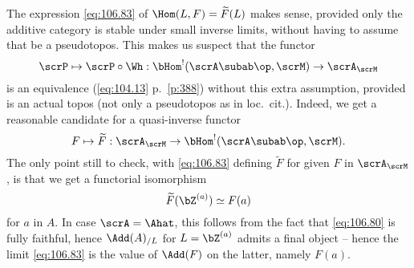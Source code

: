 \begin{remark}
  The expression \eqref{eq:106.83} of $\Hom(L,F)=\widetilde F(L)$
  makes sense, provided only the additive category \scrM{} is stable
  under small inverse limits, without having to assume that \scrM{} be
  a pseudotopos. This makes us suspect that the functor
  \[\scrP\mapsto \scrP\circ\Wh :
  \bHom^!(\scrA\subab\op,\scrM)\to\scrA_\scrM\]
  is an equivalence (\eqref{eq:104.13} p.\ \ref{p:388}) without this
  extra assumption, provided \scrA{} is an actual topos (not only a
  pseudotopos as in loc.\ cit.). Indeed, we get a reasonable candidate
  for a quasi-inverse functor
  \[F\mapsto\widetilde
  F:\scrA_\scrM\to\bHom^!(\scrA\subab\op,\scrM).\]
  The only point still to check, with \eqref{eq:106.83} defining
  $\widetilde F$ for given $F$ in $\scrA_\scrM$, is that we get a
  functorial isomorphism
  \[\widetilde F(\bZ^{(a)}) \simeq F(a)\]
  for $a$ in $A$. In case $\scrA=\Ahat$, this follows from the fact
  that \eqref{eq:106.80} is fully faithful, hence $\Add(A)_{/L}$ for
  $L=\bZ^{(a)}$ admits a final object -- hence the limit
  \eqref{eq:106.83} is the value of $\Add(F)$ on the latter, namely
  $F(a)$.
\end{remark}

